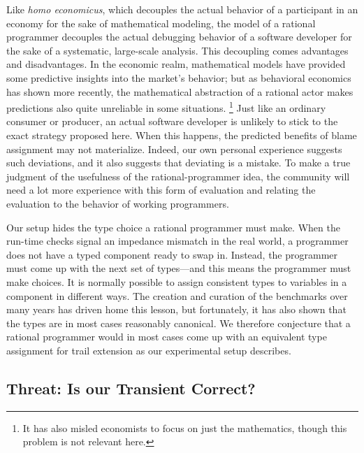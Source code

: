 Like {\em homo economicus\/}, which decouples the actual behavior of a
participant in an economy for the sake of mathematical modeling, the model of a
rational programmer decouples the actual debugging behavior of a software
developer for the sake of a systematic, large-scale analysis. This decoupling
comes advantages and disadvantages. In the economic realm, mathematical models
have provided some predictive insights into the market's behavior; but as
behavioral economics has shown more recently, the mathematical abstraction of a
rational actor makes predictions also quite unreliable in some situations.
\footnote{It has also misled economists to focus on just the mathematics, though
this problem is not relevant here.}  Just like an ordinary consumer or producer,
an actual software developer is unlikely to stick to the exact strategy proposed
here. When this happens, the predicted benefits of blame assignment may not
materialize. Indeed, our own personal experience suggests such deviations, and
it also suggests that deviating is a mistake. To make a true judgment of the
usefulness of the rational-programmer idea, the community will need a lot more
experience with this form of evaluation and relating the evaluation to the
behavior of working programmers.

Our setup hides the type choice a rational programmer must make. When the
run-time checks signal an impedance mismatch in the real world, a programmer
does not have a typed component ready to swap in. Instead, the programmer must
come up with the next set of types---and this means the programmer must make
choices. It is normally possible to assign consistent types to variables in a
component in different ways. The creation and curation of the benchmarks over
many years has driven home this lesson, but fortunately, it has also shown that
the types are in most cases reasonably canonical.  We therefore conjecture that
a rational programmer would in most cases come up with an equivalent type
assignment for trail extension as our experimental setup describes.


\subsection{Threat: Is our Transient Correct?}
\label{sec:threat:transient}

